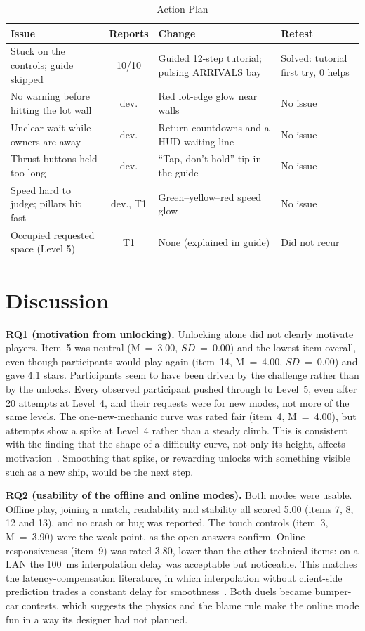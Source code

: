 \documentclass[conference]{IEEEtran}
\begin{document}
\begin{table}[t]
\caption{Action Plan}
\label{tab:actions}
\centering
\footnotesize
\begin{tabular}{@{}L{2.4cm}cL{2.6cm}L{1.2cm}@{}}
\toprule
Issue & Reports & Change & Retest \\
\midrule
Stuck on the controls; guide skipped & 10/10 & Guided 12-step tutorial; pulsing ARRIVALS bay & Solved: tutorial first try, 0 helps \\
No warning before hitting the lot wall & dev. & Red lot-edge glow near walls & No issue \\
Unclear wait while owners are away & dev. & Return countdowns and a HUD waiting line & No issue \\
Thrust buttons held too long & dev. & ``Tap, don't hold'' tip in the guide & No issue \\
Speed hard to judge; pillars hit fast & dev., T1 & Green--yellow--red speed glow & No issue \\
Occupied requested space (Level 5) & T1 & None (explained in guide) & Did not recur \\
\bottomrule
\end{tabular}
\end{table}

\section{Discussion}
\textbf{RQ1 (motivation from unlocking).} Unlocking alone did not clearly motivate players. Item~5 was neutral (M~=~3.00, $SD$~=~0.00) and the lowest item overall, even though participants would play again (item~14, M~=~4.00, $SD$~=~0.00) and gave 4.1 stars. Participants seem to have been driven by the challenge rather than by the unlocks. Every observed participant pushed through to Level~5, even after 20 attempts at Level~4, and their requests were for new modes, not more of the same levels. The one-new-mechanic curve was rated fair (item~4, M~=~4.00), but attempts show a spike at Level~4 rather than a steady climb. This is consistent with the finding that the shape of a difficulty curve, not only its height, affects motivation~\cite{raofernandes2022}. Smoothing that spike, or rewarding unlocks with something visible such as a new ship, would be the next step.

\textbf{RQ2 (usability of the offline and online modes).} Both modes were usable. Offline play, joining a match, readability and stability all scored 5.00 (items 7, 8, 12 and 13), and no crash or bug was reported. The touch controls (item~3, M~=~3.90) were the weak point, as the open answers confirm. Online responsiveness (item~9) was rated 3.80, lower than the other technical items: on a LAN the 100~ms interpolation delay was acceptable but noticeable. This matches the latency-compensation literature, in which interpolation without client-side prediction trades a constant delay for smoothness~\cite{liu2022}. Both duels became bumper-car contests, which suggests the physics and the blame rule make the online mode fun in a way its designer had not planned.
\end{document}
